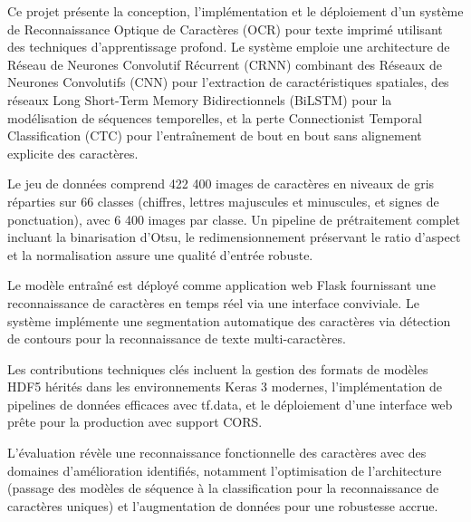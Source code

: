 Ce projet présente la conception, l'implémentation et le déploiement d'un système de
Reconnaissance Optique de Caractères (OCR) pour texte imprimé utilisant des techniques
d'apprentissage profond. Le système emploie une architecture de Réseau de Neurones
Convolutif Récurrent (CRNN) combinant des Réseaux de Neurones Convolutifs (CNN) pour
l'extraction de caractéristiques spatiales, des réseaux Long Short-Term Memory
Bidirectionnels (BiLSTM) pour la modélisation de séquences temporelles, et la perte
Connectionist Temporal Classification (CTC) pour l'entraînement de bout en bout sans
alignement explicite des caractères.

Le jeu de données comprend 422 400 images de caractères en niveaux de gris réparties
sur 66 classes (chiffres, lettres majuscules et minuscules, et signes de ponctuation),
avec 6 400 images par classe. Un pipeline de prétraitement complet incluant la
binarisation d'Otsu, le redimensionnement préservant le ratio d'aspect et la
normalisation assure une qualité d'entrée robuste.

Le modèle entraîné est déployé comme application web Flask fournissant une reconnaissance
de caractères en temps réel via une interface conviviale. Le système implémente une
segmentation automatique des caractères via détection de contours pour la reconnaissance
de texte multi-caractères.

Les contributions techniques clés incluent la gestion des formats de modèles HDF5
hérités dans les environnements Keras 3 modernes, l'implémentation de pipelines de
données efficaces avec tf.data, et le déploiement d'une interface web prête pour la
production avec support CORS.

L'évaluation révèle une reconnaissance fonctionnelle des caractères avec des domaines
d'amélioration identifiés, notamment l'optimisation de l'architecture (passage des
modèles de séquence à la classification pour la reconnaissance de caractères uniques)
et l'augmentation de données pour une robustesse accrue.



